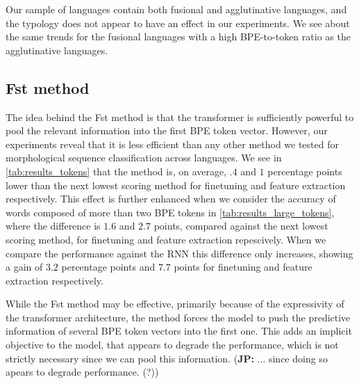 \documentclass[11pt]{article}
\newcommand\jp[1]{(\textbf{JP:} #1)}
\newcommand\adam[1]{(\textbf{Adam:} #1)}
\begin{document}
        Our sample of languages contain both fusional and
     agglutinative languages, and the typology does not appear to have
     an effect in our experiments. We see about the same trends for
     the fusional languages with a high BPE-to-token ratio as the
     agglutinative languages.

    

    \subsection{Fst method}

            The idea behind the Fst method is that the transformer is
     sufficiently powerful to pool the relevant information into the
     first BPE token vector.
                            However, our experiments reveal that it is
     less efficient than any other method we tested for morphological
     sequence classification across languages. We see in
     \cref{tab:results_tokens} that the method is, on average, $.4$
     and $1$ percentage points lower than the next lowest scoring
     method for finetuning and feature extraction respectively.
             This effect is further enhanced when we consider the
     accuracy of words composed of more than two BPE tokens in
     \cref{tab:results_large_tokens}, where the difference is $1.6$
     and $2.7$ points, compared against the next lowest scoring
     method, for finetuning and feature extraction repescively. When
     we compare the performance against the RNN this difference only
     increases, showing a gain of $3.2$ percentage points and $7.7$
     points for finetuning and feature extraction respectively.

                             While the Fst method may be effective,
     primarily because of the expressivity of the transformer
     architecture, the method forces the model to push the predictive
     information of several BPE token vectors into the first one. This
     adds an implicit objective to the model, that appears to degrade
     the performance, which is not strictly necessary since we can
     pool this information.
    \jp{... since doing so apears to degrade performance. (?)}
\end{document}

